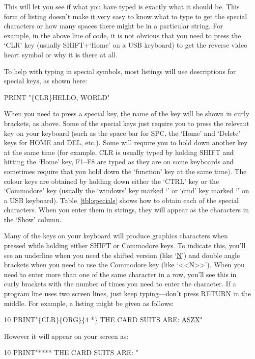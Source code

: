 This will let you see if what you have typed is exactly what it should be.  This form of listing doesn't make it very easy to know what to type to get the special characters or how many spaces there might be in a particular string.  For example, in the above line of code, it is not obvious that you need to press the `CLR' key (usually SHIFT+`Home' on a USB keyboard) to get the reverse video heart symbol or why it is there at all.

To help with typing in special symbols, most listings will use descriptions for special keys, as shown here:
\begin{basic}
PRINT "\{CLR\}HELLO, WORLD"
\end{basic}

When you need to press a special key, the name of the key will be shown in curly brackets, as above.  Some of the special keys just require you to press the relevant key on your keyboard (such as the space bar for SPC, the `Home' and `Delete' keys for HOME and DEL, etc.).  Some will require you to hold down another key at the same time (for example, CLR is usually typed by holding SHIFT and hitting the `Home' key, F1--F8 are typed as they are on some keyboards and sometimes require that you hold down the `function' key at the same time).  The colour keys are obtained by holding down either the `CTRL' key or the `Commodore' key (usually the `windows' key marked `\winkey' or `cmd' key marked `\cmdkey' on a USB keyboard).  Table~\ref{tbl:specials} shows how to obtain each of the special characters.  When you enter them in strings, they will appear as the characters in the `Show' column.

Many of the keys on your keyboard will produce graphics characters when pressed while holding either SHIFT or Commodore keys.  To indicate this, you'll see an underline when you need the shifted version (like `\underline{N}') and double angle brackets when you need to use the Commodore key (like `<<N>>').  When you need to enter more than one of the same character in a row, you'll see this in curly brackets with the number of times you need to enter the character.  If a program line uses two screen lines, just keep typing---don't press RETURN in the middle.  For example, a listing might be given as follows:
\begin{basic}
10 PRINT"\{CLR\}\{ORG\}\{4 *\} THE CARD SUITS ARE:
   \underline{ASZX}"
\end{basic}

However it will appear on your screen as:
\begin{code}
10 PRINT"**** THE CARD SUITS ARE: 
"
\end{code}

